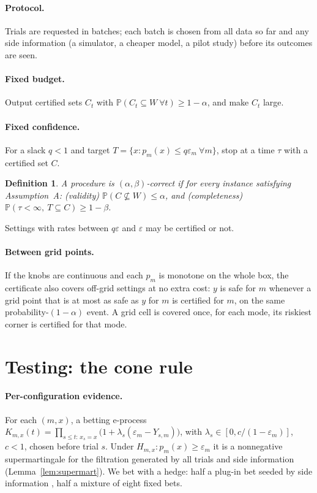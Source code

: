 \documentclass{article}
\newtheorem{definition}{Definition}
\newcommand{\eps}{\varepsilon}
\renewcommand{\P}{\mathbb{P}}
\begin{document}
\paragraph{Protocol.} Trials are requested in batches; each batch is chosen
from all data so far and any side information (a simulator, a cheaper
model, a pilot study) before its outcomes are seen.

\paragraph{Fixed budget.} Output certified sets $C_t$ with
$\P(C_t\subseteq W \ \forall t) \ge 1-\alpha$, and make $C_t$ large.

\paragraph{Fixed confidence.} For a slack $q<1$ and target
$T = \{x : p_m(x)\le q\eps_m\ \forall m\}$, stop at a time $\tau$ with a
certified set $C$.
\begin{definition}
A procedure is \emph{$(\alpha,\beta)$-correct} if for every instance
satisfying Assumption~A: (validity) $\P(C\not\subseteq W)\le\alpha$, and
(completeness) $\P(\tau<\infty,\ T\subseteq C)\ge 1-\beta$.
\end{definition}
Settings with rates between $q\eps$ and $\eps$ may be certified or not.

\paragraph{Between grid points.} If the knobs are continuous and each
$p_m$ is monotone on the whole box, the certificate also covers off-grid
settings at no extra cost: $y$ is safe for $m$ whenever a grid point that
is at most as safe as $y$ for $m$ is certified for $m$, on the same
probability-$(1-\alpha)$ event. A grid cell is covered once, for each
mode, its riskiest corner is certified for that mode.

\section{Testing: the cone rule}\label{sec:cone}

\paragraph{Per-configuration evidence.} For each $(m,x)$, a betting
e-process
$K_{m,x}(t) = \prod_{s\le t:\,x_s=x}\bigl(1+\lambda_s(\eps_m - Y_{s,m})\bigr)$,
with $\lambda_s\in[0, c/(1-\eps_m)]$, $c<1$, chosen before trial $s$. Under
$H_{m,x}: p_m(x)\ge\eps_m$ it is a nonnegative supermartingale for the
filtration generated by all trials and side information
(Lemma~\ref{lem:supermart}). We bet with a hedge: half a plug-in bet seeded
by side information \citep{waudbysmith2024betting}, half a mixture of eight
fixed bets.
\end{document}
